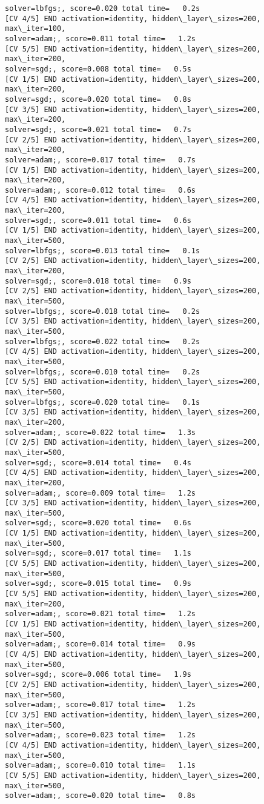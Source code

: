\documentclass[11pt]{article}
\begin{document}
\begin{Verbatim}[commandchars=\\\{\}]
solver=lbfgs;, score=0.020 total time=   0.2s
[CV 4/5] END activation=identity, hidden\_layer\_sizes=200, max\_iter=100,
solver=adam;, score=0.011 total time=   1.2s
[CV 5/5] END activation=identity, hidden\_layer\_sizes=200, max\_iter=200,
solver=sgd;, score=0.008 total time=   0.5s
[CV 1/5] END activation=identity, hidden\_layer\_sizes=200, max\_iter=200,
solver=sgd;, score=0.020 total time=   0.8s
[CV 3/5] END activation=identity, hidden\_layer\_sizes=200, max\_iter=200,
solver=sgd;, score=0.021 total time=   0.7s
[CV 2/5] END activation=identity, hidden\_layer\_sizes=200, max\_iter=200,
solver=adam;, score=0.017 total time=   0.7s
[CV 1/5] END activation=identity, hidden\_layer\_sizes=200, max\_iter=200,
solver=adam;, score=0.012 total time=   0.6s
[CV 4/5] END activation=identity, hidden\_layer\_sizes=200, max\_iter=200,
solver=sgd;, score=0.011 total time=   0.6s
[CV 1/5] END activation=identity, hidden\_layer\_sizes=200, max\_iter=500,
solver=lbfgs;, score=0.013 total time=   0.1s
[CV 2/5] END activation=identity, hidden\_layer\_sizes=200, max\_iter=200,
solver=sgd;, score=0.018 total time=   0.9s
[CV 2/5] END activation=identity, hidden\_layer\_sizes=200, max\_iter=500,
solver=lbfgs;, score=0.018 total time=   0.2s
[CV 3/5] END activation=identity, hidden\_layer\_sizes=200, max\_iter=500,
solver=lbfgs;, score=0.022 total time=   0.2s
[CV 4/5] END activation=identity, hidden\_layer\_sizes=200, max\_iter=500,
solver=lbfgs;, score=0.010 total time=   0.2s
[CV 5/5] END activation=identity, hidden\_layer\_sizes=200, max\_iter=500,
solver=lbfgs;, score=0.020 total time=   0.1s
[CV 3/5] END activation=identity, hidden\_layer\_sizes=200, max\_iter=200,
solver=adam;, score=0.022 total time=   1.3s
[CV 2/5] END activation=identity, hidden\_layer\_sizes=200, max\_iter=500,
solver=sgd;, score=0.014 total time=   0.4s
[CV 4/5] END activation=identity, hidden\_layer\_sizes=200, max\_iter=200,
solver=adam;, score=0.009 total time=   1.2s
[CV 3/5] END activation=identity, hidden\_layer\_sizes=200, max\_iter=500,
solver=sgd;, score=0.020 total time=   0.6s
[CV 1/5] END activation=identity, hidden\_layer\_sizes=200, max\_iter=500,
solver=sgd;, score=0.017 total time=   1.1s
[CV 5/5] END activation=identity, hidden\_layer\_sizes=200, max\_iter=500,
solver=sgd;, score=0.015 total time=   0.9s
[CV 5/5] END activation=identity, hidden\_layer\_sizes=200, max\_iter=200,
solver=adam;, score=0.021 total time=   1.2s
[CV 1/5] END activation=identity, hidden\_layer\_sizes=200, max\_iter=500,
solver=adam;, score=0.014 total time=   0.9s
[CV 4/5] END activation=identity, hidden\_layer\_sizes=200, max\_iter=500,
solver=sgd;, score=0.006 total time=   1.9s
[CV 2/5] END activation=identity, hidden\_layer\_sizes=200, max\_iter=500,
solver=adam;, score=0.017 total time=   1.2s
[CV 3/5] END activation=identity, hidden\_layer\_sizes=200, max\_iter=500,
solver=adam;, score=0.023 total time=   1.2s
[CV 4/5] END activation=identity, hidden\_layer\_sizes=200, max\_iter=500,
solver=adam;, score=0.010 total time=   1.1s
[CV 5/5] END activation=identity, hidden\_layer\_sizes=200, max\_iter=500,
solver=adam;, score=0.020 total time=   0.8s
    \end{Verbatim}
\end{document}
